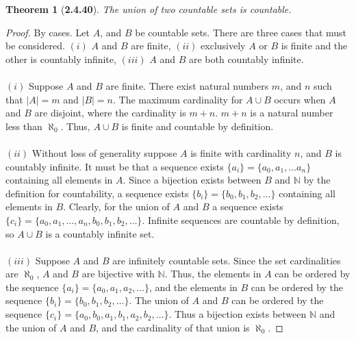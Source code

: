 \documentclass[a4paper, 12pt]{article}
\theoremstyle{plain}
\newtheorem*{theorem*}{Theorem}
\begin{document}
	
\begin{theorem*}[\textbf{2.4.40}]
    The union of two countable sets is countable.
\end{theorem*}

\begin{proof}
    By cases. Let $A$, and $B$ be countable sets. There are three cases that must be considered. 
    $(i)$ $A$ and $B$ are finite, $(ii)$ exclusively $A$ or $B$ is finite and the other is 
    countably infinite, $(iii)$ $A$ and $B$ are both countably infinite.
    \\ \\
    $(i)$ Suppose $A$ and $B$ are finite. There exist natural numbers $m$, and $n$ such that 
    $|A| = m$ and $|B| = n$. The maximum cardinality for $A \cup B$ occurs when $A$ and $B$ are 
    disjoint, where the cardinality is $m + n$. $m+n$ is a natural number less than $\aleph_0$. 
    Thus, $A \cup B$ is finite and countable by definition. 
    \\ \\
    $(ii)$ Without loss of generality suppose $A$ is finite with cardinality $n$, and $B$ is 
    countably infinite. It must be that a sequence exists $\{a_i\} = \{a_0, a_1, \dots a_n\}$ 
    containing all elements in $A$. Since a bijection exists between $B$ and $\mathbb{N}$ by the 
    definition for countability, a sequence exists $\{b_i\} = \{b_0, b_1, b_2, \dots \}$ containing 
    all elements in $B$. Clearly, for the union of $A$ and $B$ a sequence exists 
    $\{c_i\} = \{a_0, a_1, \dots, a_n, b_0, b_1, b_2, \dots \}$. Infinite sequences are countable 
    by definition, so $A \cup B$ is a countably infinite set.
    \\ \\
    $(iii)$ Suppose $A$ and $B$ are infinitely countable sets. Since the set cardinalities are 
    $\aleph_0$, $A$ and $B$ are bijective with $\mathbb{N}$. Thus, the elements in $A$ can be 
    ordered by the sequence $\{a_i\} = \{a_0, a_1, a_2, \dots\}$, and the elements in $B$ can be 
    ordered by the sequence $\{b_i\} = \{b_0, b_1, b_2, \dots \}$. The union of $A$ and $B$ can be 
    ordered by the sequence $\{c_i\} = \{a_0, b_0, a_1, b_1, a_2, b_2, \dots\}$. Thus a bijection 
    exists between $\mathbb{N}$ and the union of $A$ and $B$, and the cardinality of that union is 
    $\aleph_0$.
\end{proof}
\end{document}
